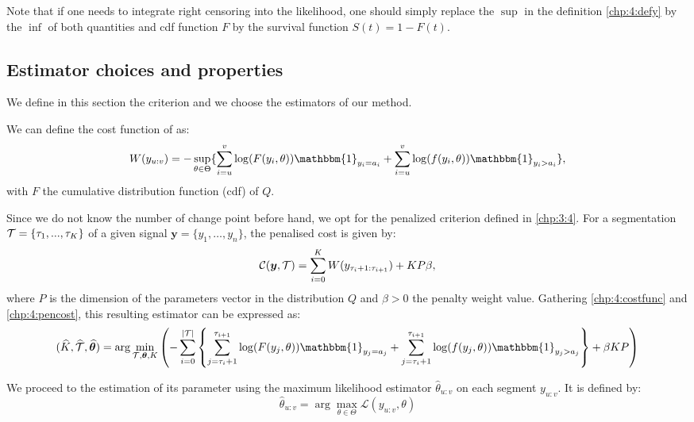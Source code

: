 Note that if one needs to integrate right censoring into the likelihood, one should simply replace the $\sup$ in the definition \ref{chp:4:defy} by the $\inf$ of both quantities and cdf function $F$ by the survival function $S(t)=1-F(t)$. 


\subsection{Estimator choices and properties}

We define in this section the criterion and we choose the estimators of our method. 

We can define the cost function of  as:    
\begin{equation}\label{chp:4:costfunc}
W(y_{u:v}) = -\sup_{\theta\in\Theta}\{\sum_{i=u}^v\log(F(y_i,\theta))\mathbbm{1}_{y_i=a_i}+\sum_{i=u}^v\log(f(y_i,\theta))\mathbbm{1}_{y_i>a_i}\},
\end{equation}
with $F$ the cumulative distribution function (cdf) of $Q$.

Since we do not know the number of change point before hand, we opt for the penalized criterion defined in \ref{chp:3:4}. For a segmentation ${\mathcal T} = \{\tau_1,...,\tau_K\}$ of a given signal $\bm y =\{y_1,\dots,y_n\}$, the penalised cost is given by: 
\begin{equation}\label{chp:4:pencost}
{\mathcal C}(\bm y,{\mathcal T})=\sum_{i=0}^{K}  W(y_{\tau_i+1:\tau_{i+1}}) + KP\beta,
\end{equation}
where $P$ is the dimension of the parameters vector in the distribution $Q$ and $\beta > 0$ the penalty weight value. Gathering \ref{chp:4:costfunc} and \ref{chp:4:pencost}, this resulting estimator can be expressed as:  
\begin{equation}\label{chp:4:estim}
(\widehat{K},\widehat{\TT},\widehat{\bm \theta}) = \arg\min_{\TT,\bm \theta,K} \left(- \sum_{i=0}^{\lvert \TT \rvert}  \left\{\sum_{j=\tau_i+1}^{\tau_{i+1}}\log(F(y_j,\theta))\mathbbm{1}_{y_j=a_j}+\sum_{j=\tau_i+1}^{\tau_{i+1}}\log(f(y_j,\theta))\mathbbm{1}_{y_j>a_j}\right\}+\beta KP\right)
\end{equation}

We proceed to the estimation of its parameter using the maximum likelihood estimator $\widehat{\theta}_{u:v}$ on each segment $y_{u:v}$. It is defined by:
\begin{equation}\label{chp:4:emv}
\widehat{\theta}_{u:v} = \arg\max_{\theta \in \Theta}\mathcal{L}(y_{u:v},\theta)
\end{equation}

